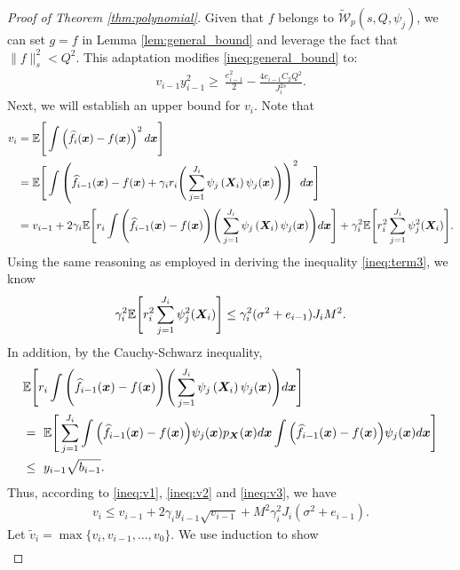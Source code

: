 \begin{proof}[Proof of Theorem \ref{thm:polynomial}]
Given that $f$ belongs to $\tilde{\mathcal{W}}_p(s,Q, {\psi_j})$, we can set $g = f$ in Lemma \ref{lem:general_bound} and leverage the fact that $\|f\|_s^2 < Q^2$. This adaptation modifies \eqref{ineq:general_bound} to:
\begin{align}
v_{i-1}y_{i-1}^2
\geq~\frac{e_{i-1}^2}{2} - \frac{4e_{i-1}C_2Q^2}{J_i^{2s}}. \label{ineq:general_bound2}
\end{align}
Next, we will establish an upper bound for $v_i$. Note that
\begin{align}
     v_i &= \mathbb{E}\Bigg[\int \left(\widehat{f}_{i}(\boldsymbol{x})-f(\boldsymbol{x})\right)^2 d\boldsymbol{x}\Bigg] \notag\\
     & = \mathbb{E}\Bigg[\int \left(\widehat{f}_{i-1}(\boldsymbol{x}) - f(\boldsymbol{x})+\gamma_ir_i\Bigg(\sum_{j=1}^{J_i}\psi_{j}\left(\bm{X}_i\right)\psi_{j}(\boldsymbol{x})\Bigg)\right)^2 d\boldsymbol{x}\Bigg]\notag\\
     &=v_{i-1}+2\gamma_i \mathbb{E}\Bigg[r_i \int \Bigg(\widehat{f}_{i-1}(\boldsymbol{x}) - f(\boldsymbol{x})\Bigg)\Bigg(\sum_{j=1}^{J_i}\psi_{j}\left(\bm{X}_i\right)\psi_{j}(\boldsymbol{x}) \Bigg)d\boldsymbol{x}  \Bigg] + \gamma_i^2 \mathbb{E} \Bigg[r_i^2\sum_{j=1}^{J_i}\psi_j^2(\bm{X}_i) \Bigg]. \label{ineq:v1}
\end{align}
Using the same reasoning as employed in deriving the inequality \eqref{ineq:term3}, we know 
\begin{align}
   \gamma_i^2 \mathbb{E} \Bigg[r_i^2\sum_{j=1}^{J_i}\psi_j^2(\bm{X}_i) \Bigg] \leq \gamma_i^2(\sigma^2 + e_{i-1})J_iM^2. \label{ineq:v2} 
\end{align}
In addition, by the Cauchy-Schwarz inequality,
\begin{align}
    &\mathbb{E}\Bigg[r_i \int \Bigg(\widehat{f}_{i-1}(\boldsymbol{x}) - f(\boldsymbol{x})\Bigg)\Bigg(\sum_{j=1}^{J_i}\psi_{j}\left(\bm{X}_i\right)\psi_{j}(\boldsymbol{x}) \Bigg)d\boldsymbol{x}  \Bigg] \notag\\
    &=~ \mathbb{E} \Bigg[ \sum_{j=1}^{J_i}\int \Big(\widehat{f}_{i-1}(\boldsymbol{x}) - f(\boldsymbol{x})\Big)\psi_j(\boldsymbol{x})p_{\bm{X}}(\boldsymbol{x}) d\boldsymbol{x} \int \Big(\widehat{f}_{i-1}(\boldsymbol{x}) - f(\boldsymbol{x})\Big)\psi_j(\boldsymbol{x}) d\boldsymbol{x}  \Bigg]\notag\\
    &\leq~ y_{i-1}\sqrt{b_{i-1}}. \label{ineq:v3}
\end{align}
Thus, according to \eqref{ineq:v1}, \eqref{ineq:v2} and \eqref{ineq:v3}, we have
\begin{align}
    v_i \leq v_{i-1} + 2\gamma_iy_{i-1}\sqrt{v_{i-1}} + M^2\gamma_i^2J_i(\sigma^2 + e_{i-1}).
\end{align}
Let $\tilde v_i = \max\{v_i, v_{i-1},\dots,v_0\}$. We use induction to show
\begin{align}

\end{align}
\end{proof}
